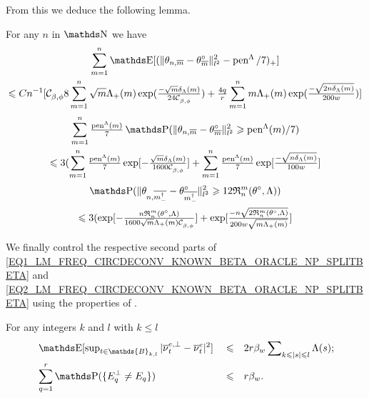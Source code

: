 From this we deduce the following lemma.
\newpage
\begin{lm}
For any $n$ in $\N$ we have
\begin{multline}\label{freq:circ:beta:exp}
\sum_{m = 1}^{n}\E [ (\Vert \theta_{n, \overline{m}} - \theta^{\circ}_{\overline{m}} \Vert_{l^{2}}^{2} - \pen^{\Lambda}/7 )_{+} ] \\
\leq C n^{-1} [\cst{\beta, \phi} 8 \sum_{m = 1}^{n}\sqrt{m} \Lambda_{+}(m) \exp (\tfrac{- \sqrt{m} \cmiSv}{24 \cst{\beta, \phi}} ) + \tfrac{4 q}{r} \sum_{m = 1}^{n} m \Lambda_{+}(m) \exp (\tfrac{- \sqrt{2 n \cmiSv}}{200 w} ) ]
\end{multline}
\begin{multline}\label{freq:circ:beta:prob1}
\sum_{m = 1}^{n} \tfrac{\pen^{\Lambda}(m)}{7} \P (\Vert \theta_{n, \overline{m}} - \theta^{\circ}_{\overline{m}} \Vert_{l^{2}}^{2} \geq \pen^{\Lambda}(m)/7 )\\
\leq 3 (\sum_{m = 1}^{n} \tfrac{\pen^{\Lambda}(m)}{7} \exp [- \tfrac{\sqrt{m}\cmiSv}{1600 \cst{\beta, \phi}} ] + \sum_{m = 1}^{n} \tfrac{\pen^{\Lambda}(m)}{7} \exp [ \tfrac{- \sqrt{n\cmiSv}}{100 w} ]
\end{multline}
\begin{multline}\label{freq:circ:beta:prob2}
\P (\Vert \theta_{n, \overline{m_{-}^{\dagger}}} - \theta^{\circ}_{\overline{m_{-}^{\dagger}}} \Vert_{l^{2}}^{2} \geq 12\daRa{\Di}{(\xdf,\Lambda)})\\
\leq 3  (\exp [- \tfrac{n \mathfrak{R}_{n}^{m}(\theta^{\circ}, \Lambda)}{1600 \sqrt{m} \Lambda_{+}(m) \cst{\beta, \phi}} ] + \exp [ \tfrac{-n \sqrt{2 \mathfrak{R}_{n}^{m}(\theta^{\circ}, \Lambda)}}{200 w \sqrt{m \Lambda_{+}(m)}} ] 
\end{multline}
\reEnd
\end{lm}

We finally control the respective second parts of \ref{EQ1_LM_FREQ_CIRCDECONV_KNOWN_BETA_ORACLE_NP_SPLITBETA} and \ref{EQ2_LM_FREQ_CIRCDECONV_KNOWN_BETA_ORACLE_NP_SPLITBETA} using the properties of .

\begin{lm}\label{LM_FREQ_CIRCDECONV_KNOWN_BETA_ORACLE_NP_BLOCKDIFF}
For any integers $k$ and $l$ with $k \leq l$
\begin{alignat}{3}
& \E [\sup\nolimits_{t \in \mathds{B}_{k, l}}  \vert \overline{\nu}^{e, \perp}_{t} - \overline{\nu}^{e}_{t}  \vert^{2}  ] && \leq && 2 r \beta_{w} \sum\nolimits_{k \leq \vert s \vert \leq l}\Lambda(s);\label{EQ1_LM_FREQ_CIRCDECONV_KNOWN_BETA_ORACLE_NP_BLOCKDIFF}\\
& \sum_{q = 1}^{r}\P(\{E_{q}^{\perp} \neq E_{q}\}) && \leq && r \beta_{w}.\label{EQ2_LM_FREQ_CIRCDECONV_KNOWN_BETA_ORACLE_NP_BLOCKDIFF}
\end{alignat}
\reEnd
\end{lm}

